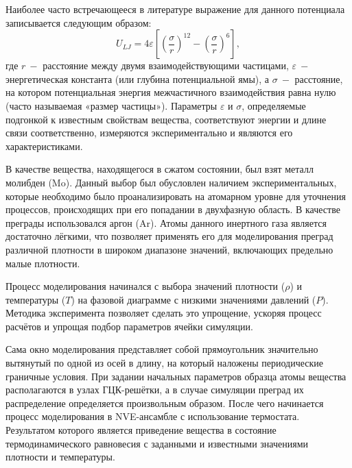 Наиболее часто встречающееся в литературе выражение для данного потенциала записывается следующим образом:
\begin{equation}
    U_{LJ} = 4\varepsilon\left[\left(\frac{\sigma}{r}\right)^{12} - \left(\frac{\sigma}{r}\right)^{6}\right],
    \label{eq:LJ}
\end{equation}
%
где $r$$~-$ расстояние между двумя взаимодействующими частицами, $\varepsilon$$~-$ энергетическая константа (или глубина потенциальной ямы), а $\sigma$$~-$ расстояние, на котором потенциальная энергия межчастичного взаимодействия равна нулю (часто называемая «размер частицы»). Параметры $\varepsilon$ и $\sigma$, определяемые подгонкой к известным свойствам вещества, соответствуют энергии и длине связи соответственно, измеряются экспериментально и являются его характеристиками.

В качестве вещества, находящегося в сжатом состоянии, был взят металл молибден (Mo). Данный выбор был обусловлен наличием экспериментальных, которые необходимо было проанализировать на атомарном уровне для уточнения процессов, происходящих при его попадании в двухфазную область.
В качестве преграды использовался аргон (Ar). Атомы данного инертного газа является достаточно лёгкими, что позволяет применять его для моделирования преград различной плотности в широком диапазоне значений, включающих предельно малые плотности.

Процесс моделирования начинался с выбора значений плотности ($\rho$) и температуры ($T$) на фазовой диаграмме с низкими значениями давлений ($P$). Методика эксперимента позволяет сделать это упрощение, ускоряя процесс расчётов и упрощая подбор параметров ячейки симуляции. 

Сама окно моделирования представляет собой прямоугольник значительно вытянутый по одной из осей в длину, на который наложены периодические граничные условия. При задании начальных параметров образца атомы вещества располагаются в узлах ГЦК-решётки, а в случае симуляции преград их распределение определяется произвольным образом. После чего начинается процесс моделирования в NVE-ансамбле с использование термостата. Результатом которого является приведение вещества в состояние термодинамического равновесия с заданными и известными значениями плотности и температуры.


